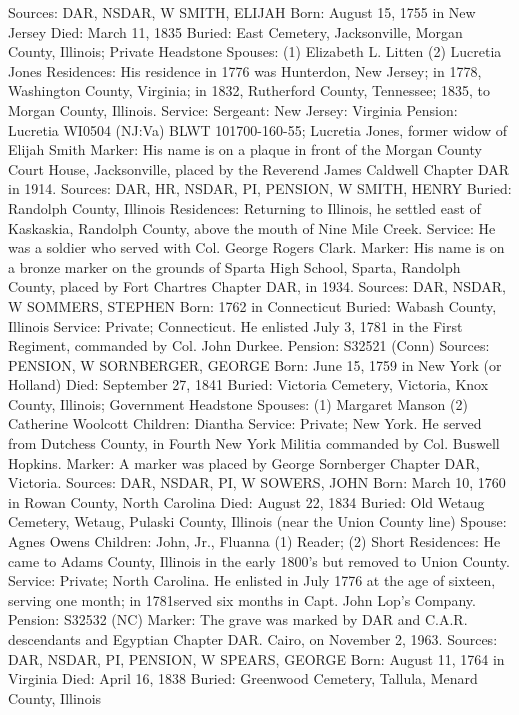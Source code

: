 Sources: DAR, NSDAR, W 
SMITH, ELIJAH
Born: August 15, 1755 in New Jersey
Died: March 11, 1835
Buried: East Cemetery, Jacksonville, Morgan County, Illinois; Private Headstone 
Spouses:  (1) Elizabeth L. Litten
	(2) Lucretia Jones Residences: His residence in 1776 was Hunterdon, New Jersey; in 1778, Washing­ton  
     County, Virginia; in 1832, Rutherford County, Tennessee; 1835, to Morgan County, Illinois.
Service:  Sergeant: New Jersey: Virginia
Pension: Lucretia WI0504 (NJ:Va) BLWT 101700-160-55; Lucretia Jones, former widow of Elijah Smith
Marker:  His name is on a plaque in front of the Morgan County Court House, Jacksonville, placed by the Reverend James Caldwell Chapter DAR in 1914.
Sources: DAR, HR, NSDAR, PI, PENSION, W 
SMITH, HENRY
Buried:  Randolph County, Illinois 
Residences: Returning to Illinois, he settled east of Kaskaskia, Randolph County, above the mouth of Nine Mile Creek.
Service: He was a soldier who served with Col. George Rogers Clark.
Marker: His name is on a bronze marker on the grounds of Sparta High School, Sparta, Randolph County, placed by Fort Chartres Chapter DAR, in 1934.
Sources: DAR, NSDAR, W 
SOMMERS, STEPHEN 
Born: 1762 in Connecticut 
Buried: Wabash County, Illinois 
Service: Private; Connecticut. He enlisted July 3, 1781 in the First Regiment, commanded by Col. John Durkee.
Pension: S32521 (Conn)
Sources: PENSION, W 
SORNBERGER, GEORGE 
Born: June 15, 1759 in New York (or Holland) 
Died: September 27, 1841 
Buried: Victoria Cemetery, Victoria, Knox County, Illinois; Government Headstone 
Spouses:  (1) Margaret Manson
(2) Catherine Woolcott
Children: Diantha
Service: Private; New York. He served from Dutchess County, in Fourth New York Militia commanded by Col. Buswell Hopkins.
Marker: A marker was placed by George Sornberger Chapter DAR, Victoria.
Sources: DAR, NSDAR, PI, W 
SOWERS, JOHN
Born: March 10, 1760 in Rowan County, North Carolina
Died: August 22, 1834
Buried: Old Wetaug Cemetery, Wetaug, Pulaski County, Illinois (near the Union County line)
Spouse:  Agnes Owens
Children: John, Jr., Fluanna (1) Reader; (2) Short Residences: He came to Adams County, Illinois in the early 1800's but removed to Union County.
Service: Private; North Carolina. He enlisted in July 1776 at the age of sixteen, serving one month; in 1781served six months in Capt. John Lop's Company.
Pension: S32532 (NC)
Marker: The grave was marked by DAR and C.A.R. descendants and Egyptian Chapter DAR. Cairo, on November 2, 1963.
Sources: DAR, NSDAR, PI, PENSION, W 
SPEARS, GEORGE
Born: August 11, 1764 in Virginia
Died: April 16, 1838
Buried: Greenwood Cemetery, Tallula, Menard County, Illinois
